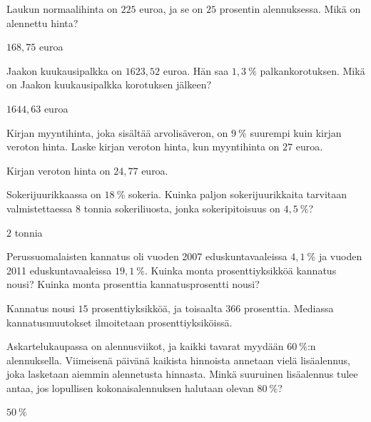 \begin{tehtavasivu}
\begin{tehtava}
    Laukun normaalihinta on $225$ euroa, ja se on $25$ prosentin alennuksessa.
    Mikä on alennettu hinta?
    \begin{vastaus}
        $168,75$ euroa
    \end{vastaus}
\end{tehtava}

\begin{tehtava}
    Jaakon kuukausipalkka on $1623,52$ euroa. Hän saa $1,3~\%$ palkankorotuksen.
    Mikä on Jaakon kuukausipalkka korotuksen jälkeen?
    \begin{vastaus}
        $1644,63$ euroa
    \end{vastaus}
\end{tehtava}

\begin{tehtava}
    Kirjan myyntihinta, joka sisältää arvolisäveron, on $9~\%$ suurempi kuin kirjan veroton hinta.
    Laske kirjan veroton hinta, kun myyntihinta on $27$ euroa.
    \begin{vastaus}
        Kirjan veroton hinta on $24,77$ euroa.
    \end{vastaus}
\end{tehtava}

\begin{tehtava}
    Sokerijuurikkaassa on $18~\%$ sokeria. Kuinka paljon sokerijuurikkaita tarvitaan valmistettaessa
    $8$ tonnia sokeriliuosta, jonka sokeripitoisuus on $4,5~\%$?
    \begin{vastaus}
        $2$ tonnia
    \end{vastaus}
\end{tehtava}

\begin{tehtava}
    Perussuomalaisten kannatus oli vuoden 2007 eduskuntavaaleissa $4,1~\%$ ja 
    vuoden 2011 eduskuntavaaleissa $19,1~\%$. Kuinka monta prosenttiyksikköä 
    kannatus nousi? Kuinka monta prosenttia kannatusprosentti nousi?
    \begin{vastaus}
        Kannatus nousi $15$ prosenttiyksikköä, ja toisaalta $366$ prosenttia.
        Mediassa kannatusmuutokset ilmoitetaan prosenttiyksiköissä.
    \end{vastaus}
\end{tehtava}

\begin{tehtava}
    Askartelukaupassa on alennusviikot, ja kaikki tavarat myydään $60~\%$:n 
    alennuksella. Viimeisenä päivänä kaikista hinnoista annetaan vielä 
    lisäalennus, joka lasketaan aiemmin alennetusta hinnasta. Minkä suuruinen 
    lisäalennus tulee antaa, jos lopullisen kokonaisalennuksen halutaan olevan $80~\%$?
    \begin{vastaus}
        $50~\%$
    \end{vastaus}
\end{tehtava}


\end{tehtavasivu}

